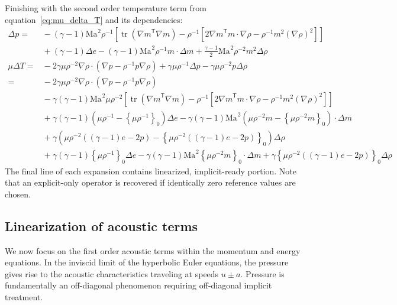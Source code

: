 \documentclass[letterpaper,11pt,nointlimits,reqno,draft]{amsbook}
\newcommand{\trans}[1]{{#1}^{\ensuremath{\mathsf{T}}}}
\newcommand{\Mach}[1][]{\ensuremath{\mbox{Ma}_{#1}}}
\newcommand{\reference}[1]{\ensuremath{\left\{#1\right\}_{0}}}
\newcommand{\lessreference}[1]
  {\ensuremath{\left({#1}-\reference{#1}\right)}}
\DeclareMathOperator{\trace}{tr}
\begin{document}
Finishing with the second order temperature term from
equation~\eqref{eq:mu_delta_T} and its dependencies:
\begin{align}
\Delta{}p =
  &{}- \left(\gamma-1\right)\Mach^{2}\rho^{-1}\left[
             \trace\left(\trans{\nabla{}m}\nabla{}m\right)
           - \rho^{-1}\left[
               2\trans{\nabla{}m}m\cdot\nabla{}\rho
             - \rho^{-1} m^2 \left(\nabla\rho\right)^{2}
           \right]
       \right]
\\
  &{}+ \left(\gamma-1\right)\Delta{}e
     - \left(\gamma-1\right)\Mach^{2}\rho^{-1}m\cdot\Delta{}m
     + \frac{\gamma-1}{2}\Mach^{2}\rho^{-2}m^2 \Delta\rho
\\
\label{eq:linear_ready_delta_T}
\mu\Delta{}T =
  &{}- 2\gamma\mu\rho^{-2}\nabla\rho\cdot
       \left(\nabla{}p-\rho^{-1}p\nabla\rho\right)
     + \gamma\mu\rho^{-1}\Delta{}p
     - \gamma\mu\rho^{-2}p\Delta\rho
\\
=
  &{}- 2\gamma\mu\rho^{-2}\nabla{}\rho\cdot
       \left(\nabla{}p-\rho^{-1}p\nabla\rho\right)
\\
  &{}- \gamma\left(\gamma-1\right)\Mach^{2}\mu\rho^{-2}\left[
             \trace\left(\trans{\nabla{}m}\nabla{}m\right)
           - \rho^{-1}\left[
               2\trans{\nabla{}m}m\cdot\nabla{}\rho
             - \rho^{-1} m^2 \left(\nabla\rho\right)^{2}
           \right]
       \right]
\\
  &{}+ \gamma\left(\gamma-1\right)\lessreference{\mu\rho^{-1}}\Delta{}e
     - \gamma\left(\gamma-1\right)\Mach^{2}
       \lessreference{\mu\rho^{-2}m}\cdot\Delta{}m
\\
  &{}+ \gamma\lessreference{
           \mu\rho^{-2}\left(\left(\gamma-1\right)e-2p\right)
       } \Delta\rho
\\
  &{}+ \gamma\left(\gamma-1\right)\reference{\mu\rho^{-1}}\Delta{}e
     - \gamma\left(\gamma-1\right)\Mach^{2}
       \reference{\mu\rho^{-2}m}\cdot\Delta{}m
     + \gamma\reference{
           \mu\rho^{-2}\left(\left(\gamma-1\right)e-2p\right)
       } \Delta\rho
\end{align}
The final line of each expansion contains linearized, implicit-ready portion.
Note that an explicit-only operator is recovered if identically zero reference
values are chosen.

\subsection{Linearization of acoustic terms}

We now focus on the first order acoustic terms within the momentum and energy
equations.  In the inviscid limit of the hyperbolic Euler equations, the
pressure gives rise to the acoustic characteristics traveling at speeds
$u\pm{}a$.  Pressure is fundamentally an off-diagonal phenomenon requiring
off-diagonal implicit treatment.
\end{document}
